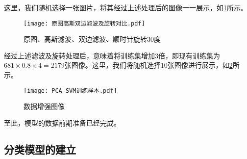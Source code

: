 \documentclass{MathorCupmodeling}
\begin{document}
	这里，我们随机选择一张图片，将其经过上述处理后的图像一一展示，如\textcolor{blue}{\cref{fig:原图高斯双边滤波及旋转对比}}所示。
	\begin{figure}[H]
		\centering
		\texttt{[image: 原图高斯双边滤波及旋转对比.pdf]}
		\caption{原图、高斯滤波、双边滤波、顺时针旋转30度}
		\label{fig:原图高斯双边滤波及旋转对比}
	\end{figure}

	经过上述滤波及旋转处理后，意味着将训练集增加3倍，即现有训练集为$681\times 0.8\times 4=2179$张图像。这里，我们将随机选择10张图像进行展示，如\textcolor{blue}{\cref{fig:数据增强}}所示。
	\begin{figure}[H]
		\centering
		\texttt{[image: PCA-SVM训练样本.pdf]}
		\caption{数据增强图像}
		\label{fig:数据增强}
	\end{figure}

	至此，模型的数据前期准备已经完成。
	\subsection{分类模型的建立}
\end{document}
